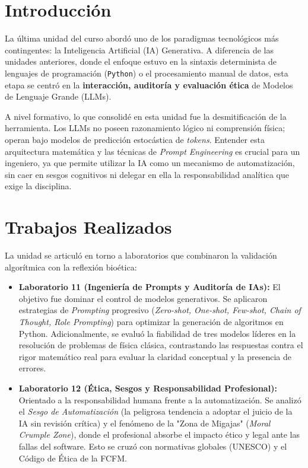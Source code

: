 \section{Introducción}

La última unidad del curso abordó uno de los paradigmas tecnológicos más contingentes: la Inteligencia Artificial (IA) Generativa. A diferencia de las unidades anteriores, donde el enfoque estuvo en la sintaxis determinista de lenguajes de programación (\texttt{Python}) o el procesamiento manual de datos, esta etapa se centró en la \textbf{interacción, auditoría y evaluación ética} de Modelos de Lenguaje Grande (LLMs).

A nivel formativo, lo que consolidé en esta unidad fue la desmitificación de la herramienta. Los LLMs no poseen razonamiento lógico ni comprensión física; operan bajo modelos de predicción estocástica de \textit{tokens}. Entender esta arquitectura matemática y las técnicas de \textit{Prompt Engineering} es crucial para un ingeniero, ya que permite utilizar la IA como un mecanismo de automatización, sin caer en sesgos cognitivos ni delegar en ella la responsabilidad analítica que exige la disciplina.

\section{Trabajos Realizados}

La unidad se articuló en torno a laboratorios que combinaron la validación algorítmica con la reflexión bioética:

\begin{itemize}
	\item \textbf{Laboratorio 11 (Ingeniería de Prompts y Auditoría de IAs):} El objetivo fue dominar el control de modelos generativos. Se aplicaron estrategias de \textit{Prompting} progresivo (\textit{Zero-shot, One-shot, Few-shot, Chain of Thought, Role Prompting}) para optimizar la generación de algoritmos en Python. Adicionalmente, se evaluó la fiabilidad de tres modelos líderes en la resolución de problemas de física clásica, contrastando las respuestas contra el rigor matemático real para evaluar la claridad conceptual y la presencia de errores.

	\item \textbf{Laboratorio 12 (Ética, Sesgos y Responsabilidad Profesional):} Orientado a la responsabilidad humana frente a la automatización. Se analizó el \textit{Sesgo de Automatización} (la peligrosa tendencia a adoptar el juicio de la IA sin revisión crítica) y el fenómeno de la "Zona de Migajas" (\textit{Moral Crumple Zone}), donde el profesional absorbe el impacto ético y legal ante las fallas del software. Esto se cruzó con normativas globales (UNESCO) y el Código de Ética de la FCFM.
\end{itemize}


